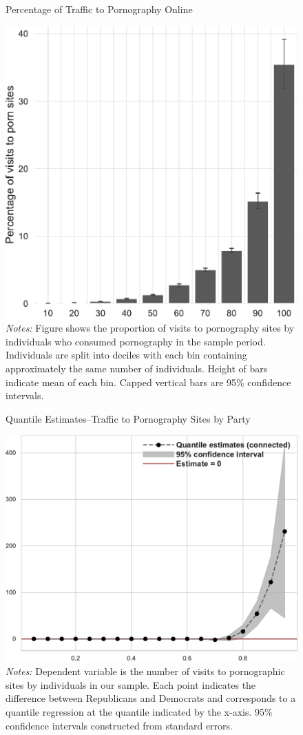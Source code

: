 \documentclass[12pt, letterpaper]{article}
\begin{document}
\begin{figure}
	\centering
	\caption{Percentage of Traffic to Pornography Online}
	\includegraphics[width=.5\linewidth]{../figs/distribution_proportion_visits_to_adultsites.pdf}
	\caption*{\footnotesize \emph{Notes:} 
		Figure shows the proportion of visits to pornography sites by individuals who consumed pornography in the sample period.
		Individuals are split into deciles with each bin containing approximately the same number of individuals.
		Height of bars indicate mean of each bin.
		Capped vertical bars are 95\% confidence intervals.
	}
	\label{fig:distribution_prop_visits}
\end{figure}

\begin{figure}
	\centering
	\caption{Quantile Estimates--Traffic to Pornography Sites by Party}
	\includegraphics[width=.6\linewidth]{../figs/quantile_reg_visits_adult.pdf}
	\caption*{\footnotesize \emph{Notes:} 
		Dependent variable is the number of visits to pornographic sites by individuals in our sample.
		Each point indicates the difference between Republicans and Democrats and corresponds to a quantile regression at the quantile indicated by the x-axis.
		95\% confidence intervals constructed from standard errors.
	}
	\label{fig:quantile_regression_visits}
\end{figure}
\end{document}
